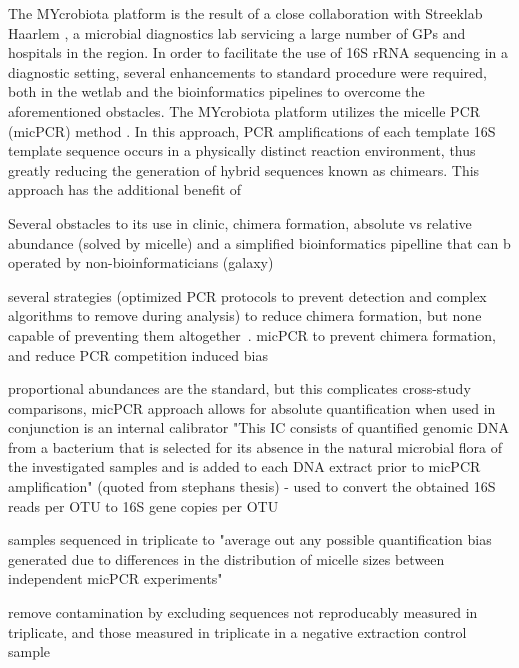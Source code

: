 The MYcrobiota platform is the result of a close collaboration with Streeklab Haarlem \cite{streeklab url}, a microbial diagnostics lab servicing a large number of GPs and hospitals in the region. In order to facilitate the use of 16S rRNA sequencing in a diagnostic setting, several enhancements to standard procedure were required, both in the wetlab and the bioinformatics pipelines to overcome the aforementioned obstacles. The MYcrobiota platform utilizes the micelle PCR (micPCR) method \cite{boers2015micelle,boers2017novel}. In this approach, PCR amplifications of each template 16S template sequence occurs in a physically distinct reaction environment, thus greatly reducing the generation of hybrid sequences known as chimears. This approach has the additional benefit of

Several obstacles to its use in clinic, chimera formation,  absolute vs relative abundance (solved by micelle) and a simplified bioinformatics pipelline that can b operated by non-bioinformaticians (galaxy)

several strategies (optimized PCR protocols to prevent detection and complex algorithms to remove during analysis) to reduce chimera formation, but none capable of preventing them altogether~\cite{huttenhower2012structure}. micPCR to prevent chimera formation, and reduce PCR competition induced bias

proportional abundances are the standard, but this complicates cross-study comparisons, micPCR approach allows for absolute quantification when used in conjunction is an internal calibrator "This IC consists of quantified genomic DNA from a bacterium that is selected for its absence in the natural microbial flora of the investigated samples and is added to each DNA extract prior to micPCR amplification" (quoted from stephans thesis) - used to convert  the obtained 16S reads per OTU to 16S gene copies per OTU

samples sequenced in triplicate to "average out any possible quantification bias generated due to differences in the distribution of micelle sizes between independent micPCR experiments"

remove contamination by excluding sequences not reproducably measured in triplicate, and those measured in triplicate in a negative extraction control sample

